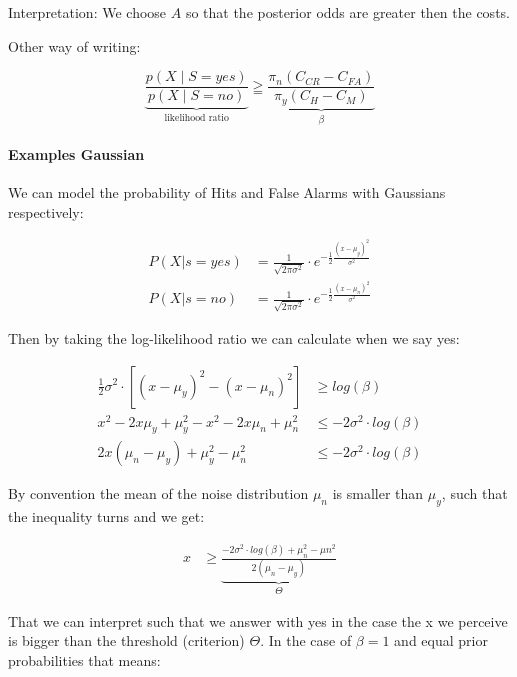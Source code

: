 Interpretation: We choose $A$ so that the posterior odds are greater then the costs.

Other way of writing:

\begin{equation}
\underbrace{\frac{p(X \mid S=yes)}{p(X \mid S=no)}}_\text{likelihood ratio} \geqq \underbrace{\frac{\pi_n(C_{CR} - C_{FA})}{\pi_y(C_H - C_M)}}_\beta
\end{equation}


\paragraph{Examples Gaussian}

We can model the probability of Hits and False Alarms with Gaussians respectively:

\begin{align*}
  P\left(X|s=yes\right) &= \frac{1}{\sqrt{2\pi \sigma^2}} \cdot e^{-\frac{1}{2}\frac{\left(x-\mu_y\right)^2}{\sigma^2}}\\
  P\left(X|s=no\right) &= \frac{1}{\sqrt{2\pi \sigma^2}} \cdot e^{-\frac{1}{2}\frac{\left(x-\mu_n\right)^2}{\sigma^2}}
\end{align*}

Then by taking the log-likelihood ratio we can calculate when we say yes:

\begin{align*}
 \frac{1}{2}\sigma^2 \cdot \left[\left(x-\mu_y\right)^2 - \left(x-\mu_n\right)^2 \right] &\geq log\left(\beta\right)\\
  x^2 - 2x\mu_y + \mu_{y}^{2} - x^2 - 2x\mu_n + \mu_{n}^{2} &\leq - 2\sigma^2 \cdot log\left(\beta\right)\\
  2x\left(\mu_n - \mu_y\right)+\mu_{y}^{2}-\mu_{n}^{2}&\leq -2\sigma^2\cdot log\left(\beta\right)\end{align*}
  
By convention the mean of the noise distribution $\mu_n$ is smaller than $\mu_y$, such that the inequality turns and we get:

\begin{align*}
  x  &\geq \underbrace{\frac{-2\sigma^2 \cdot log\left(\beta\right) + \mu_{n}^{2}-\mu{n}^{2}}{2\left(\mu_n-\mu_y\right)}}_{\Theta}
\end{align*}

That we can interpret such that we answer with yes in the case the x we perceive is bigger than the threshold (criterion) $\Theta$.
In the case of $\beta = 1$ and equal prior probabilities that means:

